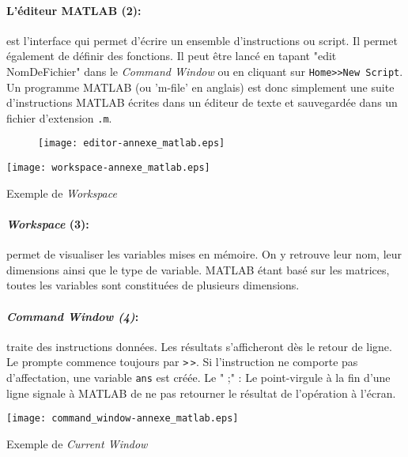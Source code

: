 \paragraph{L'éditeur MATLAB (2): } est l'interface qui permet d'écrire
un ensemble d'instructions ou script. Il permet également de définir 
des fonctions. Il peut être lancé en tapant "edit NomDeFichier" dans le 
\emph{Command Window} ou en cliquant sur \verb?Home>>New Script?.
Un programme MATLAB (ou 'm-file' en anglais) est donc simplement
une suite d'instructions MATLAB écrites dans un éditeur de texte et 
sauvegardée dans un fichier d'extension \texttt{.m}.
\begin{figure}[!h]
    \centering
    \texttt{[image: editor-annexe\_matlab.eps]}
\end{figure}
\begin{marginfigure}
    \centering
    \texttt{[image: workspace-annexe\_matlab.eps]}
    \caption{Exemple de \emph{Workspace}\label{fig-Workspace}}    
\end{marginfigure}
\paragraph*{\emph{Workspace} (3): } permet de visualiser les variables mises 
en mémoire. On y retrouve leur nom, leur dimensions ainsi que le type 
de variable. MATLAB étant basé sur les matrices, toutes les
variables sont constituées de plusieurs dimensions.

\paragraph*{\emph{Command Window (4)}: } traite des instructions
données. Les résultats s'afficheront dès le retour de ligne. Le prompte 
commence toujours par \texttt{>}\,\texttt{>}. Si l'instruction ne 
comporte pas d'affectation, une variable \texttt{ans} est créée.
Le " ;" : Le point-virgule à la fin d'une ligne signale à MATLAB de ne pas
retourner le résultat de l'opération à l'écran.
\begin{marginfigure}
    \centering
    \texttt{[image: command\_window-annexe\_matlab.eps]}
    \caption{Exemple de \emph{Current Window}\label{fig-CW}}    
\end{marginfigure}
\clearpage
\restoregeometry
\captionsetup{width=0.9\linewidth}
